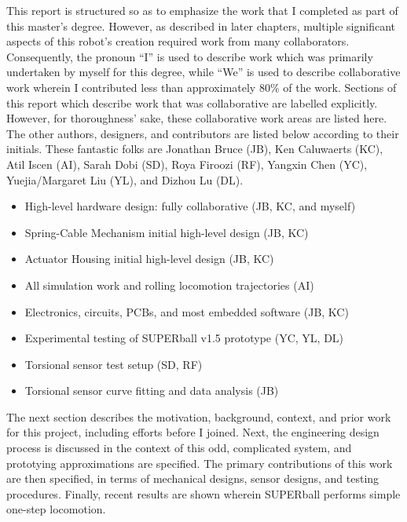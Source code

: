\documentclass[12pt]{report}
\begin{document}
This report is structured so as to emphasize the work that I completed as part of this master's degree.
However, as described in later chapters, multiple significant aspects of this robot's creation required work from many collaborators.
Consequently, the pronoun ``I'' is used to describe work which was primarily undertaken by myself for this degree, while ``We'' is used to describe collaborative work wherein I contributed less than approximately 80\% of the work.
Sections of this report which describe work that was collaborative are labelled explicitly.
However, for thoroughness' sake, these collaborative work areas are listed here.
The other authors, designers, and contributors are listed below according to their initials.
These fantastic folks are Jonathan Bruce (JB), Ken Caluwaerts (KC), Atil Iscen (AI), Sarah Dobi (SD), Roya Firoozi (RF), Yangxin Chen (YC), Yuejia/Margaret Liu (YL), and Dizhou Lu (DL).

\begin{itemize}
  \setlength{\itemsep}{0cm}%
  \setlength{\parskip}{0cm}%
  \item High-level hardware design: fully collaborative (JB, KC, and myself)
  \item Spring-Cable Mechanism initial high-level design (JB, KC)
  \item Actuator Housing initial high-level design (JB, KC)
  \item All simulation work and rolling locomotion trajectories (AI)
  \item Electronics, circuits, PCBs, and most embedded software (JB, KC)
  \item Experimental testing of SUPERball v1.5 prototype (YC, YL, DL)
  \item Torsional sensor test setup (SD, RF)
  \item Torsional sensor curve fitting and data analysis (JB)
\end{itemize}
 
The next section describes the motivation, background, context, and prior work for this project, including efforts before I joined.
Next, the engineering design process is discussed in the context of this odd, complicated system, and prototying approximations are specified.
The primary contributions of this work are then specified, in terms of mechanical designs, sensor designs, and testing procedures.
Finally, recent results are shown wherein SUPERball performs simple one-step locomotion.


\end{document}
